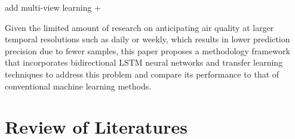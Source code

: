 \documentclass[a4paper,fleqn]{cas-dc}
\begin{document}
\par add multi-view learning $+$


Given the limited amount of research on anticipating air quality at larger temporal resolutions such as daily or weekly, which results in lower prediction precision due to fewer samples, this paper proposes a methodology framework that incorporates bidirectional LSTM neural networks and transfer learning techniques to address this problem and compare its performance to that of conventional machine learning methods.

\section{Review of Literatures}
\end{document}

